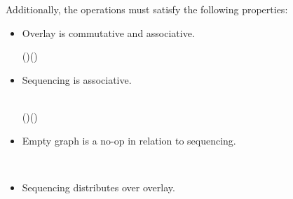 Additionally, the operations must satisfy the following properties:

\begin{itemize}
\item{Overlay is commutative and associative.
\begin{hscode}\SaveRestoreHook
{}%
%
%
\>[3]{}\;\mathbin{:}\;\;\;\;\;\;(\;\D{+}\;)\;\D{+}\;\;\;\;\D{+}\;(\;\D{+}\;){}\<[E]%
\\
\>[3]{}\;\mathbin{:}\;\;\;\;\;\;\D{+}\;\;\;\;\D{+}\;\<[E]%
\ColumnHook
\end{hscode}\resethooks
}
\item{Sequencing is associative.
\begin{hscode}\SaveRestoreHook
{}%
%
%
%
\>[3]{}\;\mathbin{:}\;\;\;\;\;\;{}\<[E]%
\\
\>[3]{}\<[5]%
\>[5]{}(\;\D{\seq}\;)\;\D{\seq}\;\;\;\;\D{\seq}\;(\;\D{\seq}\;){}\<[E]%
\ColumnHook
\end{hscode}\resethooks
}
\item{Empty graph is a no-op in relation to sequencing.
\begin{hscode}\SaveRestoreHook
{}%
%
%
\>[3]{}\;\mathbin{:}\;\;\;\;\D{\varepsilon}\;\D{\seq}\;\;\;\<[E]%
\\
\>[3]{}\;\mathbin{:}\;\;\;\;\;\D{\seq}\;\D{\varepsilon}\;\;\<[E]%
\ColumnHook
\end{hscode}\resethooks
}
\item{Sequencing distributes over overlay.
\begin{hscode}\SaveRestoreHook
{}%
%
%
%
\>[3]{}\;\mathbin{:}\;\;\;\;\;\;{}\<[E]%

\end{hscode}}
\end{itemize}
